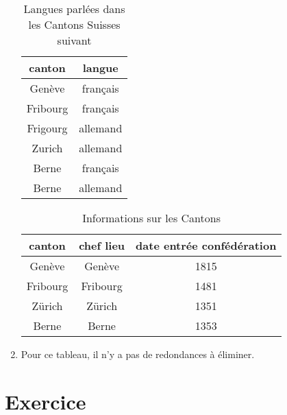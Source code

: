 \documentclass{article}
\begin{document}
\begin{enumerate}
\begin{table}[h!]
    \centering
    \begin{tabular}{|c|c|}
        \hline
        canton & langue \\
        \hline
        \hline
        Genève & français \\
        \hline
        Fribourg & français \\
        \hline
        Frigourg & allemand \\
        \hline
        Zurich & allemand \\
        \hline
        Berne & français \\
        \hline
        Berne & allemand \\
        \hline
    \end{tabular}
    \caption{Langues parlées dans les Cantons Suisses suivant}
    \label{tab:my_label}
\end{table}

\begin{table}[h!]
    \centering
    \begin{tabular}{|c|c|c|}
        \hline
        canton & chef lieu & date entrée confédération \\
        \hline
        \hline
        Genève & Genève & 1815 \\
        \hline
        Fribourg & Fribourg & 1481 \\
        \hline
        Zürich & Zürich & 1351 \\
        \hline
        Berne & Berne & 1353 \\
        \hline
        
    \end{tabular}
    \caption{Informations sur les Cantons}
    \label{tab:my_label}
\end{table}

\item Pour ce tableau, il n'y a pas de redondances à éliminer.

\end{enumerate}

\section{Exercice}
\end{document}
